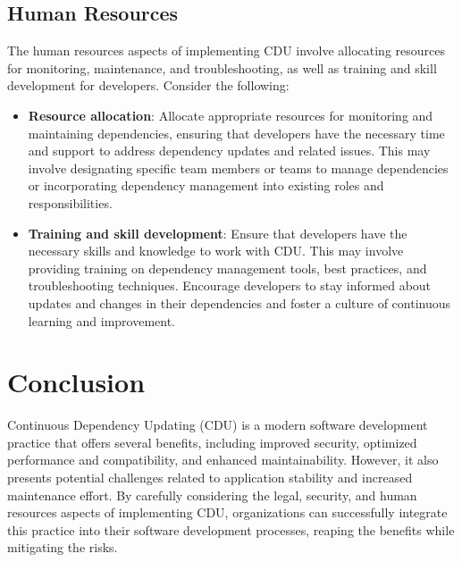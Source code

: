 \documentclass[10pt]{article}
\begin{document}
\subsection{Human Resources}
The human resources aspects of implementing CDU involve allocating resources for monitoring, maintenance, and troubleshooting, as well as training and skill development for developers. Consider the following:

\begin{itemize}
  \item \textbf{Resource allocation}: Allocate appropriate resources for monitoring and maintaining dependencies, ensuring that developers have the necessary time and support to address dependency updates and related issues. This may involve designating specific team members or teams to manage dependencies or incorporating dependency management into existing roles and responsibilities.
  \item \textbf{Training and skill development}: Ensure that developers have the necessary skills and knowledge to work with CDU. This may involve providing training on dependency management tools, best practices, and troubleshooting techniques. Encourage developers to stay informed about updates and changes in their dependencies and foster a culture of continuous learning and improvement.
\end{itemize}

\section{Conclusion}
Continuous Dependency Updating (CDU) is a modern software development practice that offers several benefits, including improved security, optimized performance and compatibility, and enhanced maintainability. However, it also presents potential challenges related to application stability and increased maintenance effort. By carefully considering the legal, security, and human resources aspects of implementing CDU, organizations can successfully integrate this practice into their software development processes, reaping the benefits while mitigating the risks.
\end{document}
